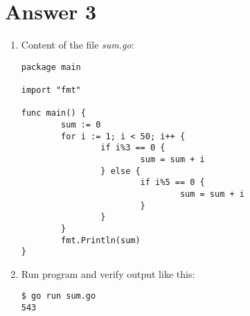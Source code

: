 \documentclass[11pt,a4paper]{article}
\begin{document}
\section*{Answer 3}
\begin{enumerate}
\item Content of the file {\it sum.go}:
\begin{verbatim}
package main

import "fmt"

func main() {
        sum := 0
        for i := 1; i < 50; i++ {
                if i%3 == 0 {
                        sum = sum + i
                } else {
                        if i%5 == 0 {
                                sum = sum + i
                        }
                }
        }
        fmt.Println(sum)
}
\end{verbatim}

\item Run program and verify output like this:
\begin{verbatim}
$ go run sum.go
543
\end{verbatim}

\end{enumerate}
\end{document}
